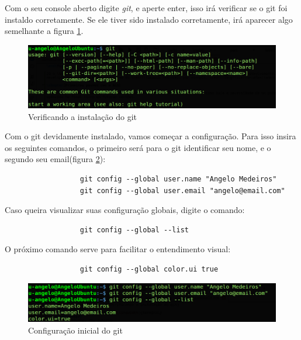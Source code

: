 \documentclass[12pt,openright,oneside,a4paper,english,brazil]{abntex2}
\begin{document}
Com o seu console aberto digite \textit{git}, e aperte enter, isso irá verificar se o git foi instaldo corretamente. Se ele tiver sido instalado corretamente, irá aparecer algo semelhante a figura \ref{terminal}.

\begin{figure}[h]
	\caption{\label{terminal}Verificando a instalação do git}
	\begin{center}
		\includegraphics[width=1\linewidth]{terminal}
	\end{center}
\end{figure}

Com o git devidamente instalado, vamos começar a configuração. Para isso insira os seguintes comandos, o primeiro será para o git identificar seu nome, e o segundo seu email(figura \ref{configuracao}):

	\begin{verbatim}
		          git config --global user.name "Angelo Medeiros"
		          git config --global user.email "angelo@email.com"
	\end{verbatim}

Caso queira visualizar suas configuração globais, digite o comando:

\begin{verbatim}
		          git config --global --list
\end{verbatim}

O próximo comando serve para facilitar o entendimento visual:

		\begin{verbatim}
		          git config --global color.ui true
		\end{verbatim}

\begin{figure}[h]
	\caption{\label{configuracao}Configuração inicial do git}
	\begin{center}
		\includegraphics[width=1\linewidth]{configuracao}
	\end{center}
\end{figure}
\end{document}
